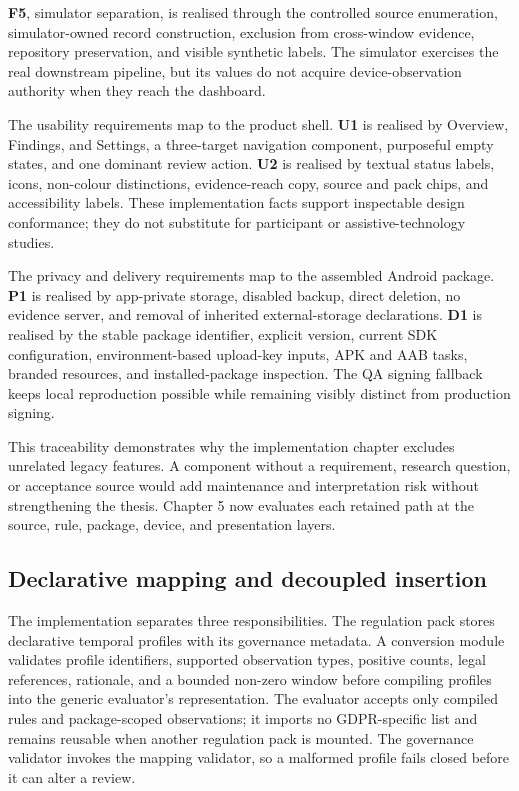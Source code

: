 \textbf{F5}, simulator separation, is realised through the controlled source enumeration, simulator-owned record construction, exclusion from cross-window evidence, repository preservation, and visible synthetic labels. The simulator exercises the real downstream pipeline, but its values do not acquire device-observation authority when they reach the dashboard.

The usability requirements map to the product shell. \textbf{U1} is realised by Overview, Findings, and Settings, a three-target navigation component, purposeful empty states, and one dominant review action. \textbf{U2} is realised by textual status labels, icons, non-colour distinctions, evidence-reach copy, source and pack chips, and accessibility labels. These implementation facts support inspectable design conformance; they do not substitute for participant or assistive-technology studies.

The privacy and delivery requirements map to the assembled Android package. \textbf{P1} is realised by app-private storage, disabled backup, direct deletion, no evidence server, and removal of inherited external-storage declarations. \textbf{D1} is realised by the stable package identifier, explicit version, current SDK configuration, environment-based upload-key inputs, APK and AAB tasks, branded resources, and installed-package inspection. The QA signing fallback keeps local reproduction possible while remaining visibly distinct from production signing.

This traceability demonstrates why the implementation chapter excludes unrelated legacy features. A component without a requirement, research question, or acceptance source would add maintenance and interpretation risk without strengthening the thesis. Chapter 5 now evaluates each retained path at the source, rule, package, device, and presentation layers.

\subsection{Declarative mapping and decoupled insertion}

The implementation separates three responsibilities. The regulation pack stores declarative temporal profiles with its governance metadata. A conversion module validates profile identifiers, supported observation types, positive counts, legal references, rationale, and a bounded non-zero window before compiling profiles into the generic evaluator's representation. The evaluator accepts only compiled rules and package-scoped observations; it imports no GDPR-specific list and remains reusable when another regulation pack is mounted. The governance validator invokes the mapping validator, so a malformed profile fails closed before it can alter a review.

